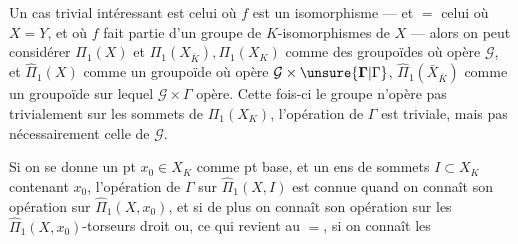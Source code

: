 Un cas trivial intéressant est celui où $f$ est un isomorphisme --- et $=$ celui où $X=Y$, et où $f$ fait partie d'un groupe  de $K$-isomorphismes de $X$ --- alors on peut considérer $\Pi_1(X)$ et $\Pi_1(X_{\bar K}),\Pi_1(X_K)$ comme des groupoïdes où opère $\mathcal G$, et $\widehat\Pi_1(X)$ comme un groupoïde où opère $\mathcal G\times\unsure{\mathbf{\Gamma}|\Gamma}$, $\widehat\Pi_1(\bar X_{\bar K})$ comme un groupoïde sur lequel $\mathcal G\times\Gamma$ opère. Cette fois-ci le groupe n'opère pas trivialement sur les sommets de $\Pi_1(X_K)$, l'opération de $\Gamma$ est triviale, mais pas nécessairement celle de $\mathcal G$.

Si on se donne un pt $x_0\in X_K$ comme pt base, et un ens de sommets $I\subset X_K$ contenant $x_0$, l'opération de $\Gamma$ sur $\widehat\Pi_1(X,I)$ est connue quand on connaît son opération sur $\widehat\Pi_1(X,x_0)$, et si de plus on connaît son opération sur les $\widehat\Pi_1(X,x_0)$-torseurs  droit
ou, ce qui revient au $=$, si on connaît les
